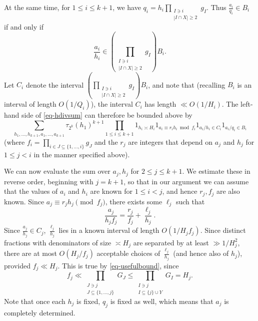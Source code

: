 \documentclass[11pt,letterpaper]{amsart}
\newcommand{\abs}[1]{\left\lvert #1\right\rvert}
\newcommand{\brac}[1]{\left( #1\right)}
\newcommand{\bracgcd}[2]{\gcd\brac{#1,#2}}
\theoremstyle{definition}
\begin{document}
At the same time, for $1 \le i \le k+1$, we have $q_i = h_i \prod_{\substack{I \ni i \\ |I \cap X| \ge 2}} g_I$. Thus $\frac{a_i}{q_i} \in B_i$ if and only if
\[ \frac{a_i}{h_i} \in \left(\prod_{\substack{I \ni i \\ |I \cap X| \ge 2}} g_I\right) B_i.\]
Let $C_i$ denote the interval $\left(\prod_{\substack{I \ni i \\ |I \cap X| \ge 2}} g_I\right) B_i$, and note that (recalling $B_i$ is an interval of length $O(1/Q_i)$), the interval $C_i$ has length $\ll O(1/H_i)$. 
The left-hand side of \eqref{eq-hdivsum} can therefore be bounded above by 
\[\sum_{h_1,\ldots,h_{k+1},a_1,\ldots,a_{k+1}}\tau_{2^k}(h_1)^{k+1}\prod_{1\leq i\leq k+1} 1_{h_i \asymp H_i}1_{a_i\equiv r_ih_i\bmod{f_i}}1_{a_i/h_i \in C_i}1_{a_i/q_i\in B_i}\]
(where $f_i=\prod_{i\in J\subseteq \{1,\ldots,i\}}g_J$ and the $r_j$ are integers that depend on $a_j$ and $h_j$ for $1\leq j<i$ in the manner specified above). 

We can now evaluate the sum over $a_j,h_j$ for $2\leq j\leq k+1$. We estimate these in reverse order, beginning with $j=k+1$, so that in our argument we can assume that the values of $a_i$ and $h_i$ are known for $1\leq i<j$, and hence $r_j,f_j$ are also known. Since $a_j \equiv r_j h_j \pmod{f_j}$, there exists some $\ell_j$ such that 
\[\frac{a_j}{h_jf_j} = \frac{r_j}{f_j} + \frac{\ell_j}{h_j}.\]
Since $\frac{a_j}{h_j} \in C_j$, $\frac{\ell_j}{h_j}$ lies in a known interval of length $O(1/H_jf_j)$. Since distinct fractions with denominators of size $\asymp H_j$ are separated by at least $\gg 1/H_j^2$, there are at most $O(H_j/f_j)$ acceptable choices of $\frac{\ell_j}{h_j}$ (and hence also of $h_j$), provided $f_j \ll H_j$. This is true by \eqref{eq-usefulbound}, since 
\[f_j \ll \prod_{\substack{J\ni j \\ J\subseteq \{1,\ldots,j\}}}G_J\leq \prod_{\substack{I\ni j\\ I\subseteq \{j\}\cup Y}}G_I=H_j.\]
Note that once each $h_j$ is fixed, $q_j$ is fixed as well, which means that $a_j$ is completely determined.
\end{document}
